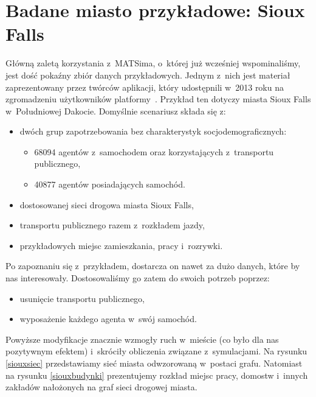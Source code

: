 \documentclass[twoside,12pt]{report}
\begin{document}
\section{Badane miasto przykładowe: Sioux Falls}

Główną zaletą korzystania z~MATSima, o~której już wcześniej wspominaliśmy, jest dość pokaźny zbiór danych przykładowych. Jednym z~nich jest materiał zaprezentowany przez twórców aplikacji, który udostępnili w~2013 roku na zgromadzeniu użytkowników platformy~\cite{siux}. Przykład ten dotyczy miasta Sioux Falls w~Południowej Dakocie. Domyślnie scenariusz składa się z:

\begin{itemize}
\item dwóch grup zapotrzebowania bez charakterystyk socjodemograficznych:
\begin{itemize}
\item 68094 agentów z~samochodem oraz korzystających z~transportu publicznego,
\item 40877 agentów posiadających samochód.
\end{itemize}
\item dostosowanej sieci drogowa miasta Sioux Falls,
\item transportu publicznego razem z~rozkładem jazdy,
\item przykładowych miejsc zamieszkania, pracy i~rozrywki.
\end{itemize}

\vspace*{20px}
Po zapoznaniu się z~przykładem, dostarcza on nawet za dużo danych, które by nas interesowały. Dostosowaliśmy go zatem do swoich potrzeb poprzez:

\begin{itemize}
\item usunięcie transportu publicznego,
\item wyposażenie każdego agenta w~swój samochód.
\end{itemize}

Powyższe modyfikacje znacznie wzmogły ruch w~mieście (co było dla nas pozytywnym efektem) i~skróciły obliczenia związane z~symulacjami. Na rysunku \ref{siouxsiec} przedstawiamy sieć miasta odwzorowaną w~postaci grafu. Natomiast na rysunku \ref{siouxbudynki}  prezentujemy  rozkład miejsc pracy, domostw i~innych zakładów nałożonych na graf sieci drogowej miasta.
\end{document}
